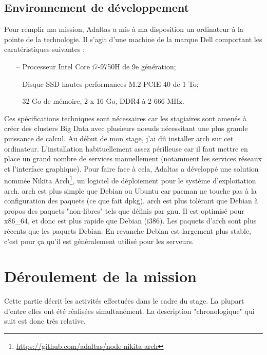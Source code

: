 \documentclass[12pt, french]{report}
\begin{document}
\section{Environnement de développement}

Pour remplir ma mission, Adaltas a mis à ma disposition un ordinateur à la pointe de la technologie. Il s'agit d'une machine de la marque Dell comportant les caratéristiques suivantes :

\begin{itemize}
  \item[--] Processeur Intel Core i7-9750H de 9e génération;
  \item[--] Disque SSD hautes performances M.2 PCIE 40 de 1 To;
  \item[--] 32 Go de mémoire, 2 x 16 Go, DDR4 à 2 666 MHz.\\
\end{itemize}

Ces spécifications techniques sont nécessaires car les stagiaires sont amenés à créer des clusters Big Data avec plusieurs noeuds nécessitant une plus grande puissance de calcul. Au début de mon stage, j’ai dû installer \gls{arch} sur cet ordinateur. L’installation  habituellement assez périlleuse car il faut mettre en place un grand nombre de services manuellement (notamment les services réseaux et l’interface graphique). Pour faire face à cela, Adaltas a développé une solution nommée Nikita Arch\footnote{\href{https://github.com/adaltas/node-nikita-arch}{https://github.com/adaltas/node-nikita-arch}}, un logiciel de déploiement pour le système d'exploitation \gls{arch}. \gls{arch} est plus simple que Debian ou Ubuntu car \gls{pacman} ne touche pas à la configuration des paquets (ce que fait \gls{dpkg}). \gls{arch} est plus tolérant que Debian à propos des paquets "non-libres" tels que définis par \gls{gnu}. Il est optimisé pour x86\_64, et donc est plus rapide que Debian (i386). Les paquets d'\gls{arch} sont plus récents que les paquets Debian. En revanche Debian est largement plus stable, c'est pour ça qu'il est généralement utilisé pour les serveurs.

\chapter{Déroulement de la mission}

Cette partie décrit les activités effectuées dans le cadre du stage. La plupart d'entre elles ont été réalisées simultanément. La description "chronologique" qui suit est donc très relative.
\end{document}
